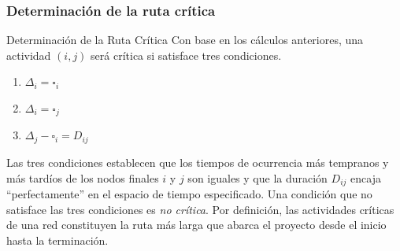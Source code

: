 \documentclass{beamer}
\begin{document}
\subsubsection{Determinación de la ruta crítica}
\begin{frame}{Determinación de la Ruta Crítica}
    Con base en los cálculos anteriores, una actividad \((i,j)\) será crítica si satisface tres condiciones.
    \begin{enumerate}
\item \(\Delta_i=\square_i\)
\item \(\Delta_i=\square_j\)
\item \(\Delta_j-\square_i= D_{ij}\)
\end{enumerate}
Las tres condiciones establecen que los tiempos de ocurrencia más tempranos y más tardíos de los nodos finales $i$ y $j$ son iguales y que la duración $D_{ij}$ encaja ``perfectamente'' en el espacio de tiempo especificado. Una condición que no satisface las tres condiciones es \textit{no crítica}.
Por definición, las actividades críticas de una red constituyen la ruta más larga que abarca el proyecto desde el inicio hasta la terminación.
\end{frame}
\end{document}
